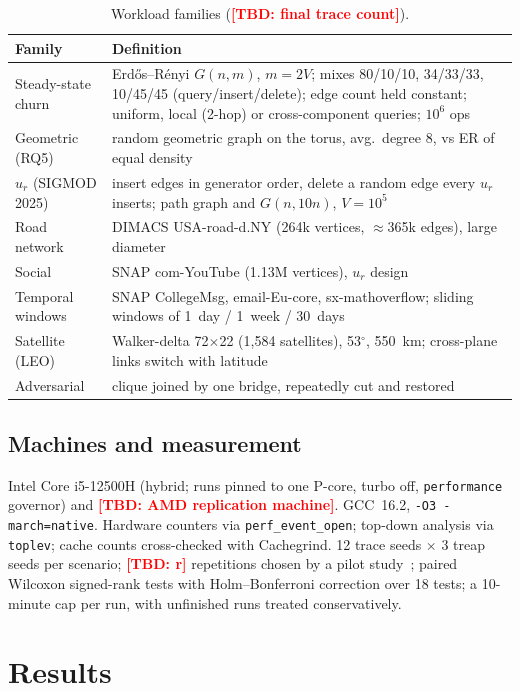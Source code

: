 \documentclass[conference]{IEEEtran}
\newcommand{\TBD}[1]{\textcolor{red}{\textbf{[TBD: #1]}}}
\begin{document}
\begin{table}[t]
\caption{Workload families (\TBD{final trace count}).}
\label{tab:workloads}
\centering\scriptsize
\begin{tabular}{@{}p{2.2cm}p{5.6cm}@{}}
\toprule
Family & Definition\\
\midrule
Steady-state churn & Erd\H{o}s--R\'enyi $G(n,m)$, $m=2V$; mixes 80/10/10, 34/33/33, 10/45/45 (query/insert/delete); edge count held constant; uniform, local (2-hop) or cross-component queries; $10^6$ ops\\
Geometric (RQ5) & random geometric graph on the torus, avg.\ degree 8, vs ER of equal density\\
$u_r$ (SIGMOD 2025) & insert edges in generator order, delete a random edge every $u_r$ inserts; path graph and $G(n,10n)$, $V=10^5$\\
Road network & DIMACS USA-road-d.NY (264k vertices, $\approx$365k edges), large diameter\\
Social & SNAP com-YouTube (1.13M vertices), $u_r$ design\\
Temporal windows & SNAP CollegeMsg, email-Eu-core, sx-mathoverflow; sliding windows of 1~day / 1~week / 30~days\\
Satellite (LEO) & Walker-delta 72$\times$22 (1{,}584 satellites), 53$^\circ$, 550~km; cross-plane links switch with latitude\\
Adversarial & clique joined by one bridge, repeatedly cut and restored\\
\bottomrule
\end{tabular}
\end{table}

\subsection{Machines and measurement}
Intel Core i5-12500H (hybrid; runs pinned to one P-core, turbo off, \texttt{performance} governor) and \TBD{AMD replication machine}. GCC~16.2, \texttt{-O3 -march=native}. Hardware counters via \texttt{perf\_event\_open}; top-down analysis via \texttt{toplev}; cache counts cross-checked with Cachegrind. 12 trace seeds $\times$ 3 treap seeds per scenario; \TBD{r} repetitions chosen by a pilot study~\cite{kalibera2013}; paired Wilcoxon signed-rank tests with Holm--Bonferroni correction over 18 tests; a 10-minute cap per run, with unfinished runs treated conservatively.

\section{Results}
\end{document}

